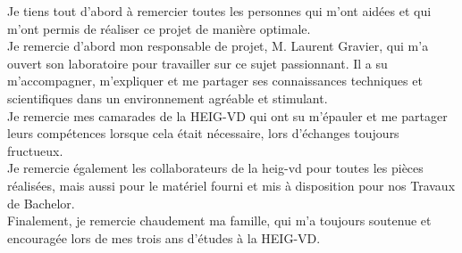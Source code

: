 Je tiens tout d'abord à remercier toutes les personnes qui m'ont aidées et qui m'ont permis de réaliser ce projet de manière optimale. \\

Je remercie d'abord mon responsable de projet, M. Laurent Gravier, qui m'a ouvert son laboratoire pour travailler sur ce sujet passionnant. Il a su
m'accompagner, m'expliquer et me partager ses connaissances techniques et scientifiques dans un environnement agréable et stimulant. \\

Je remercie mes camarades de la HEIG-VD qui ont su m'épauler et me partager leurs compétences lorsque cela était nécessaire, lors d'échanges
toujours fructueux. \\

Je remercie également les collaborateurs de la \gls{heig-vd} pour toutes les pièces réalisées, mais aussi pour le matériel
fourni et mis à disposition pour nos Travaux de Bachelor.\\

Finalement, je remercie chaudement ma famille, qui m'a toujours soutenue et encouragée lors de mes trois ans d'études à la HEIG-VD.
